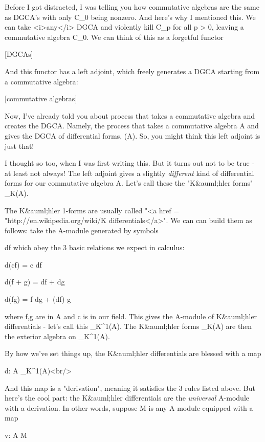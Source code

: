 Before I got distracted, I was telling you how commutative algebras
are the same as DGCA's with only C_{0} being nonzero.  And
here's why I mentioned this.  We can take <i>any</i> DGCA and
violently kill C_{p} for all p > 0, leaving a commutative
algebra C_{0}.  We can think of this as a forgetful functor

[DGCAs] 

And this functor has a left adjoint, which freely generates a DGCA
starting from a commutative algebra:

[commutative algebras] \to  [DGCAs]

Now, I've already told you about process that takes a commutative 
algebra and creates the DGCA.  Namely, the process that takes a
commutative algebra A and gives the DGCA of differential forms, 
\Omega (A).  So, you might think this left adjoint is just that!

I thought so too, when I was first writing this.  But it turns out not
to be true - at least not always!  The left adjoint gives a slightly
\emph{different} kind of differential forms for our commutative
algebra A.  Let's call these the "K&auml;hler forms"
\Omega _{K}(A).

The K&auml;hler 1-forms are usually called "<a href =
"http://en.wikipedia.org/wiki/K%
differentials</a>".  We can can build them as follows: take the
A-module generated by symbols

df
which obey the 3 basic relations we expect in calculus:

d(cf) = c df

d(f + g) = df + dg

d(fg) = f dg + (df) g

where f,g are in A and c is in our field.  This gives the A-module of
K&auml;hler differentials - let's call this
\Omega _{K}^{1}(A).  The K&auml;hler forms
\Omega _{K}(A) are then the exterior algebra on
\Omega _{K}^{1}(A).

By how we've set things up, the K&auml;hler differentials 
are blessed with a map

d: A  \to  \Omega _{K}^{1}(A)<br/>

And this map is a "derivation",
meaning it satisfies the 3 rules listed above.
But here's the cool part: the K&auml;hler differentials are the
\emph{universal} A-module with a derivation.  In other words, suppose
M is any A-module equipped with a map

v: A \to  M

